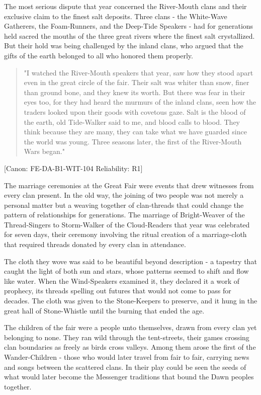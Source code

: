 The most serious dispute that year concerned the River-Mouth clans and
their exclusive claim to the finest salt deposits. Three clans - the
White-Wave Gatherers, the Foam-Runners, and the Deep-Tide Speakers - had
for generations held sacred the mouths of the three great rivers where
the finest salt crystallized. But their hold was being challenged by the
inland clans, who argued that the gifts of the earth belonged to all who
honored them properly.

\begin{quote}
"I watched the River-Mouth speakers that year, saw how they stood apart
even in the great circle of the fair. Their salt was whiter than snow,
finer than ground bone, and they knew its worth. But there was fear in
their eyes too, for they had heard the murmurs of the inland clans, seen
how the traders looked upon their goods with covetous gaze.
\textquotesingle Salt is the blood of the earth,\textquotesingle{} old
Tide-Walker said to me, \textquotesingle and blood calls to blood. They
think because they are many, they can take what we have guarded since
the world was young.\textquotesingle{} Three seasons later, the first of
the River-Mouth Wars began."
\end{quote}

{[}Canon: FE-DA-B1-WIT-104 \textbar{} Reliability: R1{]}

The marriage ceremonies at the Great Fair were events that drew
witnesses from every clan present. In the old way, the joining of two
people was not merely a personal matter but a weaving together of
clan-threads that could change the pattern of relationships for
generations. The marriage of Bright-Weaver of the Thread-Singers to
Storm-Walker of the Cloud-Readers that year was celebrated for seven
days, their ceremony involving the ritual creation of a marriage-cloth
that required threads donated by every clan in attendance.

The cloth they wove was said to be beautiful beyond description - a
tapestry that caught the light of both sun and stars, whose patterns
seemed to shift and flow like water. When the Wind-Speakers examined it,
they declared it a work of prophecy, its threads spelling out futures
that would not come to pass for decades. The cloth was given to the
Stone-Keepers to preserve, and it hung in the great hall of
Stone-Whistle until the burning that ended the age.

The children of the fair were a people unto themselves, drawn from every
clan yet belonging to none. They ran wild through the tent-streets,
their games crossing clan boundaries as freely as birds cross valleys.
Among them arose the first of the Wander-Children - those who would
later travel from fair to fair, carrying news and songs between the
scattered clans. In their play could be seen the seeds of what would
later become the Messenger traditions that bound the Dawn peoples
together.

